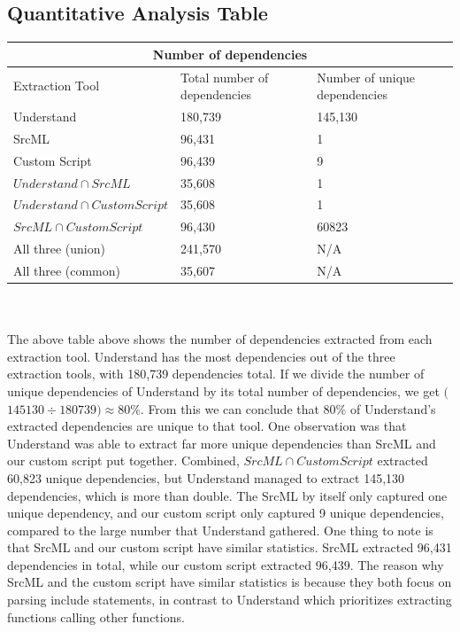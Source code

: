 \documentclass[12pt, dvipsnames, a4paper]{article}
\begin{document}
\subsection{Quantitative Analysis Table}
\begin{tabular}{ |p{6cm}||p{6cm}|p{5cm}|  }
	\hline
	\multicolumn{3}{|c|}{Number of dependencies}                                                    \\
	\hline
	Extraction Tool                  & Total number of dependencies & Number of unique dependencies \\
	\hline
	Understand                       & 180,739                      & 145,130                       \\
	SrcML                            & 96,431                       & 1                             \\
	Custom Script                    & 96,439                       & 9                             \\
	$Understand \cap  SrcML$         & 35,608                       & 1                             \\
	$Understand \cap  Custom Script$ & 35,608                       & 1                             \\
	$SrcML \cap Custom Script$       & 96,430                       & 60823                         \\
	All three (union)                & 241,570                      & N/A                           \\
	All three (common)               & 35,607                       & N/A                           \\
	\hline
\end{tabular}
\newline
\newline
\\
\\
The above table above shows the number of dependencies extracted from each extraction tool. Understand has the most dependencies out of the three extraction tools, with 180,739 dependencies total. If we divide the number of unique dependencies of Understand by its total number of dependencies, we get $($$145130 \div 180739$$) \approx 80\%$. From this we can conclude that 80\% of Understand's extracted dependencies are unique to that tool.
\newline
One observation was that Understand was able to extract far more unique dependencies than SrcML and our custom script put together. Combined, $SrcML \cap Custom Script$ extracted 60,823 unique dependencies, but Understand managed to extract 145,130 dependencies, which is more than double. The SrcML by itself only captured one unique dependency, and our custom script only captured 9 unique dependencies, compared to the large number that Understand gathered.
\newline
One thing to note is that SrcML and our custom script have similar statistics. SrcML extracted 96,431 dependencies in total, while our custom script extracted 96,439. The reason why SrcML and the custom script have similar statistics is because they both focus on parsing include statements, in contrast to Understand which prioritizes extracting functions calling other functions.
\end{document}
